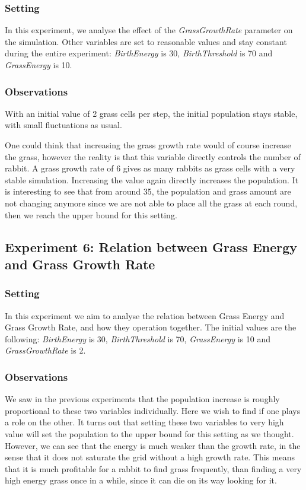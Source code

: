 \documentclass[11pt]{article}
\begin{document}
\subsubsection{Setting}
In this experiment, we analyse the effect of the \textit{GrassGrowthRate} parameter on the simulation. Other variables are set to reasonable values and stay constant during the entire experiment: \textit{BirthEnergy} is 30, \textit{BirthThreshold} is 70 and \textit{GrassEnergy} is 10.


\subsubsection{Observations}
With an initial value of 2 grass cells per step, the initial population stays stable, with small fluctuations as usual.

One could think that increasing the grass growth rate would of course increase the grass, however the reality is that this variable directly controls the number of rabbit. A grass growth rate of 6 gives as many rabbits as grass cells with a very stable simulation. Increasing the value again directly increases the population. It is interesting to see that from around 35, the population and grass amount are not changing anymore since we are not able to place all the grass at each round, then we reach the upper bound for this setting.

\subsection{Experiment 6: Relation between Grass Energy and Grass Growth Rate}

\subsubsection{Setting}
In this experiment we aim to analyse the relation between Grass Energy and Grass Growth Rate, and how they operation together.
The initial values are the following: \textit{BirthEnergy} is 30, \textit{BirthThreshold} is 70, \textit{GrassEnergy} is 10 and \textit{GrassGrowthRate} is 2.

\subsubsection{Observations}
We saw in the previous experiments that the population increase is roughly proportional to these two variables individually. Here we wish to find if one plays a role on the other. It turns out that setting these two variables to very high value will set the population to the upper bound for this setting as we thought. However, we can see that the energy is much weaker than the growth rate, in the sense that it does not saturate the grid without a high growth rate. This means that it is much profitable for a rabbit to find grass frequently, than finding a very high energy grass once in a while, since it can die on its way looking for it.
\end{document}
